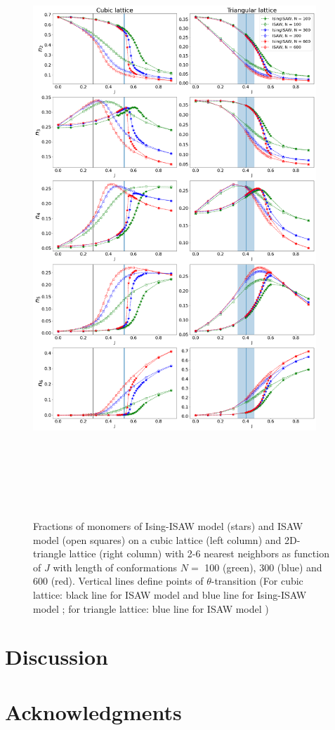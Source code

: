 \documentclass[a4paper]{jpconf}
\begin{document}
\begin{figure}
    \centering
    \includegraphics[width=0.95\textwidth, height=22.5cm]{Images/Ising_vs_ISAW.png}
    \caption{Fractions of monomers of Ising-ISAW model (stars) and ISAW model (open squares) on a cubic lattice (left column) and 2D-triangle lattice (right column) with 2-6 nearest neighbors as function of $J$ with length of conformations $N = $ 100 (green), 300 (blue) and 600 (red). Vertical lines define points of $\theta$-transition (For cubic lattice: black line for ISAW model \cite{Tesi1996} and blue line for Ising-ISAW model \cite{Foster2021}; for triangle lattice: blue line for ISAW model \cite{Privman1986})}
    \label{fig:Ising_vs_ISAW}
\end{figure}


\section{Discussion}

\section{Acknowledgments}

\newpage


\end{document}
